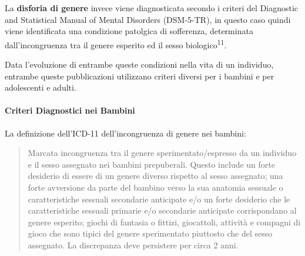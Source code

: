 \documentclass[12pt]{article}
\makeatletter
\newcommand{\cslcitation}[2]
 {\protect\hyper@linkstart{cite}{citeproc_bib_item_#1}#2\hyper@linkend}
\makeatother
\begin{document}
La \textbf{disforia di genere} invece viene diagnosticata secondo i criteri del Diagnostic and Statistical Manual of Mental Disorders (DSM-5-TR), in questo caso quindi viene identificata una condizione patolgica di sofferenza, determinata dall'incongruenza tra il genere esperito ed il sesso biologico\textsuperscript{\cslcitation{11}{11}}.

Data l'evoluzione di entrambe queste condizioni nella vita di un individuo, entrambe queste pubblicazioni utilizzano criteri diversi per i bambini e per adolescenti e adulti.
\paragraph{Criteri Diagnostici nei Bambini}
\label{sec:org2716858}

La definizione dell'ICD-11 dell'incongruenza di genere nei bambini:

\begin{quote}
Marcata incongruenza tra il  genere sperimentato/espresso da un individuo e il sesso assegnato nei bambini prepuberali.  Questo include un forte desiderio di essere di un genere diverso rispetto al sesso assegnato; una  forte avversione da parte del bambino verso la sua anatomia sessuale o caratteristiche sessuali secondarie anticipate e/o un forte desiderio che le caratteristiche sessuali primarie e/o secondarie anticipate corrispondano al genere esperito; giochi di fantasia o fittizi, giocattoli, attività e compagni di gioco che sono tipici del genere sperimentato piuttosto che del sesso assegnato. La discrepanza deve persistere per circa 2 anni.
\end{quote}
\end{document}
